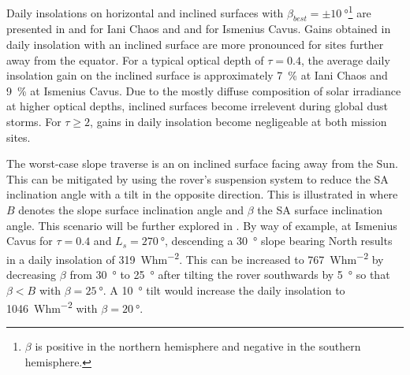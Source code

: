 \vspace{0.5cm}

Daily insolations on horizontal and inclined surfaces with $\beta_{best}=\pm\SI{10}{\degree}$\footnote{$\beta$ is positive in the northern hemisphere and negative in the southern hemisphere.} are presented in  and  for Iani Chaos and  and  for Ismenius Cavus. Gains obtained in daily insolation with an inclined surface are more pronounced for sites further away from the equator. For a typical optical depth of $\tau = 0.4$, the average daily insolation gain on the inclined surface is approximately \SI{7}{\percent} at Iani Chaos and \SI{9}{\percent} at Ismenius Cavus.
Due to the mostly diffuse composition of solar irradiance at higher optical depths, inclined surfaces become irrelevent during global dust storms. For $\tau \geq 2$, gains in daily insolation become negligeable at both mission sites.



\vspace{0.5cm}



\vspace{0.5cm}



\vspace{0.5cm}



The worst-case slope traverse is an on inclined surface facing away from the Sun. This can be mitigated by using the rover's suspension system to reduce the \ac{SA} inclination angle with a tilt in the opposite direction. This is illustrated in  where $B$ denotes the slope surface inclination angle and $\beta$ the \ac{SA} surface inclination angle. This scenario will be further explored in . By way of example, at Ismenius Cavus for $\tau = 0.4$ and $L_{s}=\SI{270}{\degree}$, descending a \SI{30}{\degree} slope bearing North results in a daily insolation of \SI{319}{Whm^{-2}}. This can be increased to \SI{767}{Whm^{-2}} by decreasing $\beta$ from \SI{30}{\degree} to \SI{25}{\degree} after tilting the rover southwards by \SI{5}{\degree} so that $\beta < B$ with $\beta = \SI{25}{\degree}$. A \SI{10}{\degree} tilt would increase the daily insolation to \SI{1046}{Whm^{-2}} with $\beta = \SI{20}{\degree}$.


